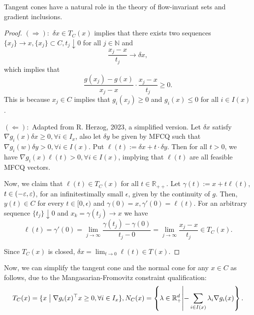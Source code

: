 \documentclass[10pt,a4paper]{article}
\begin{document}
Tangent cones have a natural role in the theory of flow-invariant sets and gradient inclusions.



\begin{proof}
    $(\Rightarrow):$ $\delta x\in T_C(x)$ implies that there exists two sequences $\{x_j\}\rightarrow x, \{x_j\}\subset C, t_j\downarrow 0$ for all $j\in \mathbb{N}$ and $$\frac{x_j-x}{t_j}\rightarrow \delta x,$$ which implies that $$\frac{g(x_j)-g(x)}{x_j-x}\cdot\frac{x_j-x}{t_j}\geq 0.$$ This is because $x_j\in C$ implies that $g_i(x_j)\geq 0$ and $g_i(x)\leq 0$ for all $i\in I(x)$.

    $(\Leftarrow):$ Adapted from R. Herzog, 2023, a simplified version. Let $\delta x$ satisfy $\nabla g_i(x)\delta x\geq 0, \forall i\in I_x$, also let $\delta y$ be given by MFCQ such that $\nabla g_i(w)\delta y>0, \forall i \in I(x)$. Put $\ell(t):=\delta x+ t\cdot\delta y$. Then for all $t>0$, we have $\nabla g_i(x) \ell(t)>0, \forall i\in I(x)$, implying that $\ell(t)$ are all feasible MFCQ vectors.

    Now, we claim that $\ell(t)\in T_C(x)$ for all $t\in \mathbb{R}_{++}$. Let $\gamma(t):=x+t\ell(t)$, $t\in(-\varepsilon, \varepsilon)$, for an infinitestimally small $\epsilon$, given by the continuity of $g$. Then, $y(t)\in C$ for every $t\in [0, \epsilon)$ and $\gamma(0)=x, \gamma'(0)=\ell(t)$. For an arbitrary sequence $\{t_j\}\downarrow0$ and $x_k = \gamma(t_j)\rightarrow x$ we have $$\ell(t)=\gamma'(0)=\lim_{j\to\infty} \frac{\gamma(t_j)-\gamma(0)}{t_j-0}=\lim_{j\to\infty}\frac{x_j-x}{t_j}\in T_C(x).$$

    Since $T_C(x)$ is closed, $\delta x=\lim_{t\to0}\ell(t)\in T(x)$.
\end{proof}

Now, we can simplify the tangent cone and the normal cone for any $x\in C$ as follows, due to the Mangasarian-Fromovitz constraint qualification: $$T_C(x)=\{x\bigm|\nabla g_i(x)^{\top} x\geq 0, \forall i \in I_x\}, N_C(x)=\left\{\lambda\in \mathbb{R}^d_{+}\middle|-\sum_{i\in I(x)} \lambda_i \nabla g_i(x)\right\}.$$
\end{document}
